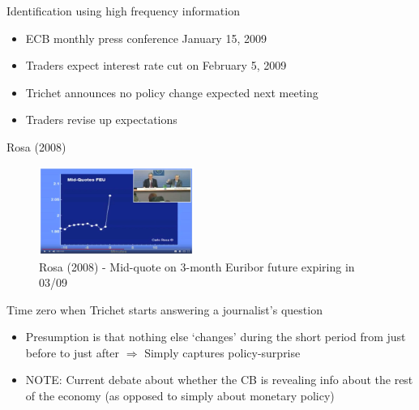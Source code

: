 
\begin{frame}{Identification using high frequency information}

\begin{itemize}
\item ECB monthly press conference January 15, 2009
\item Traders expect interest rate cut on February 5, 2009
\item Trichet announces no policy change expected next meeting
\item Traders revise up expectations
\end{itemize}

\end{frame}


\begin{frame}{Rosa (2008)}

\begin{figure}
\caption[Rosa (2008)]{Rosa (2008) - Mid-quote on 3-month Euribor future expiring in 03/09}
\centering
\label{fig:trichet_mkt_react}
\includegraphics[width=0.45\textwidth]{Figures/trichet_mkt_react.JPG}
\end{figure}

Time zero when Trichet starts answering a journalist's question
\begin{itemize}
\item	Presumption is that nothing else `changes' during the short period from just before to just after $\Rightarrow$ Simply captures policy-surprise
\item	NOTE: Current debate about whether the CB is revealing info about the rest of the economy (as opposed to simply about monetary policy)
\end{itemize}

\end{frame}

